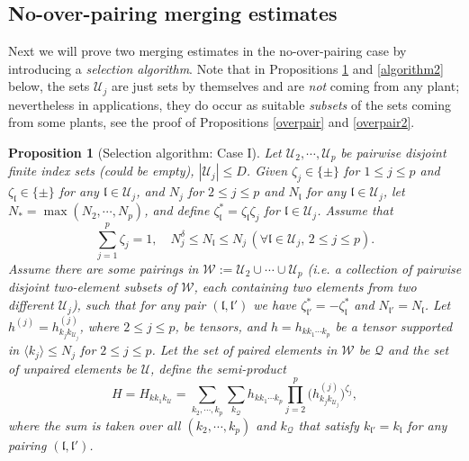 \documentclass[11 pt,reqno]{amsart}
\newtheorem{prop}[thm]{Proposition}
\theoremstyle{definition}
\theoremstyle{remark}
\numberwithin{equation}{section}
\newcommand{\Qc}{\mathcal{Q}}
\newcommand{\Uc}{\mathcal{U}}
\newcommand{\Wc}{\mathcal{W}}
\newcommand{\lf}{\mathfrak{l}}
\begin{document}
{  \subsection{No-over-pairing merging estimates}\label{mainproof2} Next we will prove two merging estimates in the no-over-pairing case by introducing a \emph{selection algorithm}. Note that in Propositions \ref{algorithm1} and \ref{algorithm2} below, the sets $\Uc_j$ are just sets by themselves and are \emph{not} coming from any plant; nevertheless in applications, they do occur as suitable \emph{subsets} of the sets coming from some plants, see the proof of Propositions \ref{overpair} and \ref{overpair2}.
  \begin{prop}[Selection algorithm: Case I]\label{algorithm1} Let $\Uc_2,\cdots,\Uc_{p}$ be pairwise disjoint finite index sets (could be empty), $|\Uc_j|\leq D$. Given $\zeta_j\in\{\pm\}$ for $1\leq j\leq p$ and $\zeta_\lf\in\{\pm\}$ for any $\lf\in\Uc_j$, and $N_j$ for $2\leq j\leq p$ and $N_\lf$ for any $\lf\in\Uc_j$, let $N_*=\max(N_2,\cdots,N_{p})$, and define $\zeta_\lf^*=\zeta_\lf\zeta_j$ for $\lf\in\Uc_j$. Assume that \[\sum_{j=1}^p\zeta_j=1,\quad N_j^\delta\leq N_\lf\leq N_j\,(\forall \lf\in \Uc_j,\,2\leq j\leq p).\]  Assume there are some pairings in $\Wc:=\Uc_2\cup\cdots\cup\Uc_{p}$ (i.e. a collection of pairwise disjoint two-element subsets of $\Wc$, each containing two elements from two different $\Uc_j$), such that for any pair $(\lf,\lf')$ we have $\zeta_{\lf'}^*=-\zeta_\lf^*$ and $N_{\lf'}=N_\lf$. Let $h^{(j)}=h_{k_jk_{\Uc_j}}^{(j)}$, where $2\leq j\leq p$, be tensors, and $h=h_{kk_1\cdots k_p}$ be a tensor supported in $\langle k_j\rangle\leq N_j$ for $2\leq j\leq p$. Let the set of paired elements in $\Wc$ be $\Qc$ and the set of unpaired elements be $\Uc$, define the semi-product
\begin{equation}\label{defH}H=H_{kk_1k_\Uc}=\sum_{k_2,\cdots,k_{p}}\sum_{k_\Qc}h_{kk_1\cdots k_p}\prod_{j=2}^{p}\big(h_{k_jk_{\Uc_j}}^{(j)}\big)^{\zeta_j},\end{equation} where the sum is taken over all $(k_2,\cdots,k_{p})$ and $k_\Qc$ that satisfy $k_{\lf'}=k_\lf$ for any pairing $(\lf,\lf')$.


\end{prop}}
\end{document}
